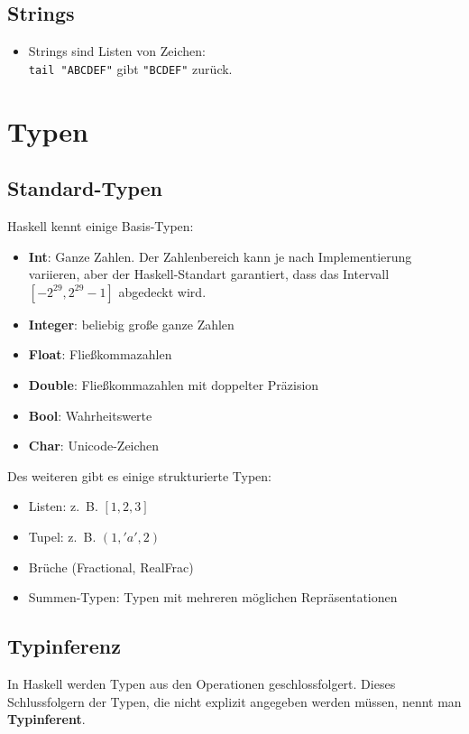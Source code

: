 \subsection{Strings}
\begin{itemize}
    \item Strings sind Listen von Zeichen:\\
          \texttt{tail "ABCDEF"} gibt \texttt{"BCDEF"} zurück.
\end{itemize}

\section{Typen}
\subsection{Standard-Typen}
Haskell kennt einige Basis-Typen:
\begin{itemize}
  \item \textbf{Int}: Ganze Zahlen. Der Zahlenbereich kann je nach Implementierung variieren,
  aber der Haskell-Standart garantiert, dass das Intervall 
  $[-2^{29}, 2^{29}-1]$ abgedeckt wird.
  \item \textbf{Integer}: beliebig große ganze Zahlen
  \item \textbf{Float}: Fließkommazahlen
  \item \textbf{Double}: Fließkommazahlen mit doppelter Präzision
  \item \textbf{Bool}: Wahrheitswerte
  \item \textbf{Char}: Unicode-Zeichen
\end{itemize}

Des weiteren gibt es einige strukturierte Typen:
\begin{itemize}
  \item Listen: z.~B. $[1,2,3]$
  \item Tupel: z.~B. $(1,'a',2)$
  \item Brüche (Fractional, RealFrac)
  \item Summen-Typen: Typen mit mehreren möglichen Repräsentationen
\end{itemize}

\subsection{Typinferenz}
In Haskell werden Typen aus den Operationen geschlossfolgert. Dieses
Schlussfolgern der Typen, die nicht explizit angegeben werden müssen,
nennt man \textbf{Typinferent}.


